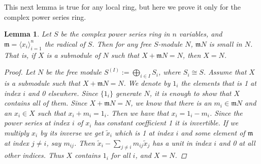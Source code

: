 \documentclass[11pt, a4paper, english]{article}
\newtheorem{lemma}[theorem]{Lemma}
\theoremstyle{definition}
\begin{document}
This next lemma is true for any local ring, but here we prove it only for the complex power series ring.

\begin{lemma}
\label{lem:radical small}
Let $S$ be the complex power series ring in $n$ variables, and $\mathfrak{m} = \langle x_i \rangle_{i=1}^n$ the radical of $S$. Then for any free $S$-module $N$, $\mathfrak{m}N$ is \textit{small} in $N$. That is, if $X$ is  a submodule of $N$ such that $X + \mathfrak{m}N = N$, then $X = N$.

\begin{proof}
Let $N$ be the free module $S^{(I)} := \bigoplus\limits_{i \in I} S_i$, where $S_i \cong S$. Assume that $X$ is a submodule such that $X + \mathfrak{m}N = N$. We denote by $1_i$ the elements that is 1 at index $i$ and 0 elsewhere. Since $\{ 1_i \}$ generate $N$, it is enough to show that $X$ contains all of them. Since $X + \mathfrak{m}N = N$, we know that there is an $m_i \in \mathfrak{m}N$ and an $x_i \in X$ such that $x_i + m_i = 1_i$. Then we have that $x_i = 1_i - m_i$. Since the power series at index $i$ of $x_i$ has constant coefficient 1 it is invertible. If we multiply $x_i$ by its inverse we get $\tilde{x}_i$ which is 1 at index $i$ and some element of $\mathfrak{m}$ at index $j \neq i$, say $m_{ij}$. Then $\tilde{x}_i - \sum\limits_{j \neq i} m_{ij}\tilde{x}_j$ has a unit in index $i$ and 0 at all other indices. Thus $X$ contains $1_i$ for all $i$, and $X = N$.
\end{proof}
\end{lemma}
\end{document}
